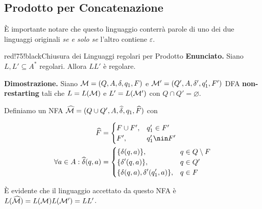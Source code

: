 \subsection{Prodotto per Concatenazione}


È importante notare che questo linguaggio conterrà parole di uno dei due linguaggi originali \textit{se e solo se} l'altro contiene \(\varepsilon\).

\begin{halfframedbox}{red!75!black}{Chiusura dei Linguaggi regolari per Prodotto}
  \textbf{Enunciato. } Siano \(L,L' \subseteq A^*\) regolari. Allora \(LL'\) è regolare.

  \begin{center}
    \textcolor{red!75!black}{\hdashrule[0.5ex]{18cm}{1pt}{3mm 3pt 1mm 2pt}}
  \end{center}

  \textbf{Dimostrazione. } Siano \(\mathcal{M}=(Q,A,\delta,q_1,F)\) e \(\mathcal{M}'=(Q',A,\delta',q_1',F')\) DFA \textbf{non-restarting} tali che \(L=L(\mathcal{M})\) e \(L'=L(\mathcal{M}')\) con \(Q \cap Q' = \varnothing\).

  Definiamo un NFA \(\widehat{\mathcal{M}}=(Q\cup Q', A, \widehat{\delta}, q_1, \widehat{F})\) con

  \begin{equation}
    \begin{split}
      \widehat{F}&=\begin{cases}
        F\cup F', & q_1' \in F'\\
        F', & q_1' \nin F'\\
      \end{cases} \\
      \forall a \in A: \widehat{\delta}(q,a)&=\begin{cases}
        \cbrakets{\delta(q,a)}, & q \in Q \setminus F\\
        \cbrakets{\delta'(q,a)}, & q \in Q' \\
        \cbrakets{\delta(q,a), \delta'(q_1',a)}, & q\in F
      \end{cases}
    \end{split}
  \end{equation}

  È evidente che il linguaggio accettato da questo NFA è \(L(\widehat{\mathcal{M}})=L(\mathcal{M})L(\mathcal{M}')=LL'\).

\end{halfframedbox}

